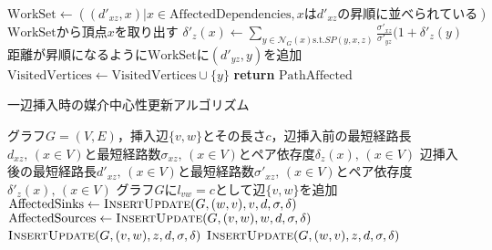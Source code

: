 \begin{algorithm}[H]
\begin{algorithmic}[1]
    \State $\mathrm{WorkSet}\gets((d'_{xz},x)|x\in\mathrm{AffectedDependencies},x\mathrm{は}d'_{xz}\mathrm{の昇順に並べられている})$
    \State $\mathrm{WorkSet}$から頂点$x$を取り出す
    \State $\delta'_z(x)\gets\sum_{y\in\mathcal{N}_G(x)\mathrm{s.t.}SP(y,x,z)}\frac{\sigma'_{xz}}{\sigma'_{yz}}(1+\delta'_z(y)$
    \State 距離が昇順になるように$\mathrm{WorkSet}$に$(d'_{yz},y)$を追加
    \State $\mathrm{VisitedVertices}\gets\mathrm{VisitedVertices}\cup\{y\}$
    \EndFor
    \EndIf
    \EndWhile
    \State \textbf{return} $\mathrm{PathAffected}$
  \end{algorithmic}
\end{algorithm}

\begin{algorithm}[H]
  \caption{一辺挿入時の媒介中心性更新アルゴリズム}
  \label{algo:update-bc-on-insert}
  \begin{algorithmic}[1]
    \Require グラフ$G=(V,E)$，挿入辺$\{v,w\}$とその長さ$c$，辺挿入前の最短経路長$d_{xz},\,(x\in V)$と最短経路数$\sigma_{xz},\,(x\in V)$とペア依存度$\delta_z(x),\,(x\in V)$
    \Ensure 辺挿入後の最短経路長$d'_{xz},\,(x\in V)$と最短経路数$\sigma'_{xz},\,(x\in V)$とペア依存度$\delta'_z(x),\,(x\in V)$
    \State グラフ$G$に$l_{vw}=c$として辺$\{v,w\}$を追加
    \State $\mathrm{AffectedSinks}\gets\textproc{InsertUpdate}(G,(w,v),v,d,\sigma,\delta)$
    \State $\mathrm{AffectedSources}\gets\textproc{InsertUpdate}(G,(v,w),w,d,\sigma,\delta)$
    \State $\textproc{InsertUpdate}(G,(v,w),z,d,\sigma,\delta)$
    \EndFor
    \State $\textproc{InsertUpdate}(G,(w,v),z,d,\sigma,\delta)$
    \EndFor
  \end{algorithmic}
\end{algorithm}

